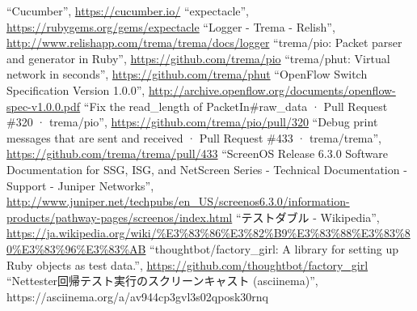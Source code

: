\begin{thebibliography}{99}
         ``Cucumber'',
         \url{https://cucumber.io/}
         ``expectacle'',
         \url{https://rubygems.org/gems/expectacle}
         ``Logger - Trema - Relish'',
         \url{http://www.relishapp.com/trema/trema/docs/logger}
         ``trema/pio: Packet parser and generator in Ruby'',
         \url{https://github.com/trema/pio}
         ``trema/phut: Virtual network in seconds'',
         \url{https://github.com/trema/phut}
         ``OpenFlow Switch Specification Version 1.0.0'',
         \url{http://archive.openflow.org/documents/openflow-spec-v1.0.0.pdf}
  ``Fix the read\_length of PacketIn\#raw\_data ·
         Pull Request \#320 · trema/pio'',
         \url{https://github.com/trema/pio/pull/320}
  ``Debug print messages that are sent and received
         · Pull Request \#433 · trema/trema'',
         \url{https://github.com/trema/trema/pull/433}
  ``ScreenOS Release 6.3.0 Software
         Documentation for SSG, ISG, and NetScreen Series - Technical
         Documentation - Support - Juniper Networks'',
         \url{http://www.juniper.net/techpubs/en_US/screenos6.3.0/information-products/pathway-pages/screenos/index.html}
  ``テストダブル - Wikipedia'',
         \url{https://ja.wikipedia.org/wiki/%E3%83%86%E3%82%B9%E3%83%88%E3%83%80%E3%83%96%E3%83%AB}
  ``thoughtbot/factory\_girl: A library for setting
         up Ruby objects as test data.'',
         \url{https://github.com/thoughtbot/factory_girl}
         ``Nettester回帰テスト実行のスクリーンキャスト (asciinema)'', https://asciinema.org/a/av944cp3gvl3s02qposk30rnq
\end{thebibliography}

